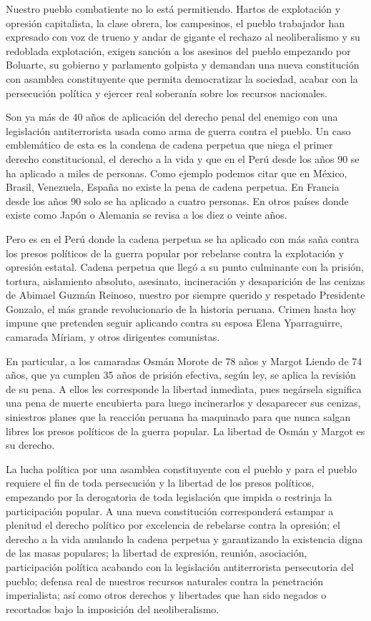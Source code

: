 \documentclass[
  jou,
  floatsintext,
  longtable,
  a4paper,
  nolmodern,
  notxfonts,
  notimes,
  12pt,
  colorlinks=true,linkcolor=blue,citecolor=blue,urlcolor=blue]{apa7}
\begin{document}
Nuestro pueblo combatiente no lo está permitiendo. Hartos de explotación
y opresión capitalista, la clase obrera, los campesinos, el pueblo
trabajador han expresado con voz de trueno y andar de gigante el rechazo
al neoliberalismo y su redoblada explotación, exigen sanción a los
asesinos del pueblo empezando por Boluarte, su gobierno y parlamento
golpista y demandan una nueva constitución con asamblea constituyente
que permita democratizar la sociedad, acabar con la persecución política
y ejercer real soberanía sobre los recursos nacionales.

Son ya más de 40 años de aplicación del derecho penal del enemigo con
una legislación antiterrorista usada como arma de guerra contra el
pueblo. Un caso emblemático de esta es la condena de cadena perpetua que
niega el primer derecho constitucional, el derecho a la vida y que en el
Perú desde los años 90 se ha aplicado a miles de personas. Como ejemplo
podemos citar que en México, Brasil, Venezuela, España no existe la pena
de cadena perpetua. En Francia desde los años 90 solo se ha aplicado a
cuatro personas. En otros países donde existe como Japón o Alemania se
revisa a los diez o veinte años.

Pero es en el Perú donde la cadena perpetua se ha aplicado con más saña
contra los presos políticos de la guerra popular por rebelarse contra la
explotación y opresión estatal. Cadena perpetua que llegó a su punto
culminante con la prisión, tortura, aislamiento absoluto, asesinato,
incineración y desaparición de las cenizas de Abimael Guzmán Reinoso,
nuestro por siempre querido y respetado Presidente Gonzalo, el más
grande revolucionario de la historia peruana. Crimen hasta hoy impune
que pretenden seguir aplicando contra su esposa Elena Yparraguirre,
camarada Míriam, y otros dirigentes comunistas.

En particular, a los camaradas Osmán Morote de 78 años y Margot Liendo
de 74 años, que ya cumplen 35 años de prisión efectiva, según ley, se
aplica la revisión de su pena. A ellos les corresponde la libertad
inmediata, pues negársela significa una pena de muerte encubierta para
luego incinerarlos y desaparecer sus cenizas, siniestros planes que la
reacción peruana ha maquinado para que nunca salgan libres los presos
políticos de la guerra popular. La libertad de Osmán y Margot es su
derecho.

La lucha política por una asamblea constituyente con el pueblo y para el
pueblo requiere el fin de toda persecución y la libertad de los presos
políticos, empezando por la derogatoria de toda legislación que impida o
restrinja la participación popular. A una nueva constitución
corresponderá estampar a plenitud el derecho político por excelencia de
rebelarse contra la opresión; el derecho a la vida anulando la cadena
perpetua y garantizando la existencia digna de las masas populares; la
libertad de expresión, reunión, asociación, participación política
acabando con la legislación antiterrorista persecutoria del pueblo;
defensa real de nuestros recursos naturales contra la penetración
imperialista; así como otros derechos y libertades que han sido negados
o recortados bajo la imposición del neoliberalismo.
\end{document}
